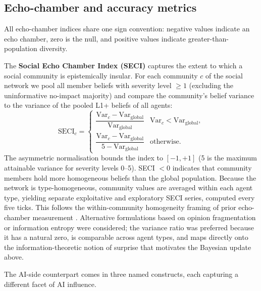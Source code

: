 \documentclass[pdflatex,sn-nature]{sn-jnl}
\begin{document}
\subsection{Echo-chamber and accuracy metrics}\label{sec:metrics}

All echo-chamber indices share one sign convention: negative values indicate an echo chamber, zero is the null, and positive values indicate greater-than-population diversity.

The \textbf{Social Echo Chamber Index (SECI)} captures the extent to which a social community is epistemically insular. For each community $c$ of the social network we pool all member beliefs with severity level $\geq 1$ (excluding the uninformative no-impact majority) and compare the community's belief variance to the variance of the pooled L1+ beliefs of all agents:
\begin{equation}
\text{SECI}_c =
\begin{cases}
\dfrac{\text{Var}_c - \text{Var}_{\text{global}}}{\text{Var}_{\text{global}}} & \text{Var}_c < \text{Var}_{\text{global}}, \\[2ex]
\dfrac{\text{Var}_c - \text{Var}_{\text{global}}}{5 - \text{Var}_{\text{global}}} & \text{otherwise}.
\end{cases}
\label{eq:seci}
\end{equation}
The asymmetric normalisation bounds the index to $[-1, +1]$ (5 is the maximum attainable variance for severity levels 0--5). SECI $< 0$ indicates that community members hold more homogeneous beliefs than the global population. Because the network is type-homogeneous, community values are averaged within each agent type, yielding separate exploitative and exploratory SECI series, computed every five ticks. This follows the within-community homogeneity framing of prior echo-chamber measurement \citep{cinelli2021echo}.
Alternative formulations based on opinion fragmentation \citep{bail2018exposure} or information entropy \citep{sasahara2021social}
were considered; the variance ratio was preferred because it has a natural zero, is comparable across agent types, and maps directly onto the information-theoretic notion of surprise that motivates the Bayesian update above.

The AI-side counterpart comes in three named constructs, each capturing a different facet of AI influence.
\end{document}
